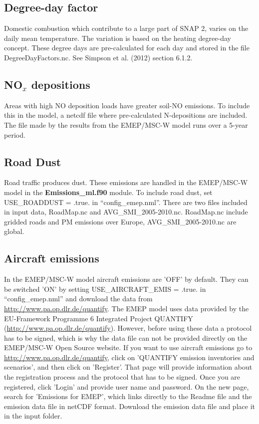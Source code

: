 \documentclass[a4paper,12pt]{report}
\begin{document}
\subsection{Degree-day factor}
Domestic combustion which contribute to a large part of SNAP 2, varies on the daily 
mean temperature. The variation is based on the heating degree-day concept. These 
degree days are pre-calculated for each day and stored in the file DegreeDayFactors.nc. 
See Simpson et al. (2012) section 6.1.2. 


\subsection{NO$_x$ depositions}
Areas with high NO deposition loads have greater soil-NO emissions. To include this in 
the model, a netcdf file where pre-calculated N-depositions are included. The file made by 
the results from the EMEP/MSC-W model runs over a 5-year period. 


\subsection{Road Dust}
Road traffic produces dust. These emissions are handled in the EMEP/MSC-W model in the 
{\bf Emissions\_ml.f90} module. To include road dust, set USE\_ROADDUST = .true. in ``config\_emep.nml''. There are two files included in input data, RoadMap.nc and 
AVG\_SMI\_2005-2010.nc. RoadMap.nc include gridded roads and PM emissions over Europe, 
AVG\_SMI\_2005-2010.nc are global. 

\subsection{Aircraft emissions}
\label{emisair}

In the EMEP/MSC-W model aircraft emissions are 'OFF' by default. 
They can be switched 'ON' by setting USE\_AIRCRAFT\_EMIS = .true. in ``config\_emep.nml'' and download the data from \url{http://www.pa.op.dlr.de/quantify}.  
The EMEP model uses data provided by the EU-Framework Programme 6 Integrated 
Project QUANTIFY (\url{http://www.pa.op.dlr.de/quantify}). However, before using 
these data a protocol has to be signed, which is why the data file can not be provided 
directly on the EMEP/MSC-W Open Source website. If you want to use aircraft emissions go to 
\url{http://www.pa.op.dlr.de/quantify}, click on 'QUANTIFY emission inventories and scenarios', 
and then click on 'Register'. That page will provide information about the registration 
process and the protocol that has to be signed. Once you are registered, click 'Login' and 
provide user name and password. On the new page, search for 'Emissions for EMEP', which 
links directly to the Readme file and the emission data file in netCDF format. Download the 
emission data file and place it in the input folder.
\end{document}
